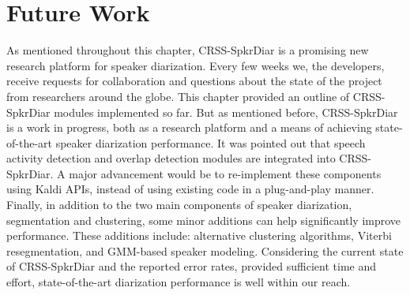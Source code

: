\section{Future Work}
\label{sec:chDiar_future}
As mentioned throughout this chapter, CRSS-SpkrDiar is a promising new research platform for speaker diarization. 
Every few weeks we, the developers, receive requests for collaboration and questions about the state of the project from researchers around the globe. 
This chapter provided an outline of CRSS-SpkrDiar modules implemented so far. 
But as mentioned before, CRSS-SpkrDiar is a work in progress, both as a research platform and a means of achieving state-of-the-art speaker diarization performance. 
It was pointed out that speech activity detection and overlap detection modules are integrated into CRSS-SpkrDiar. 
A major advancement would be to re-implement these components using Kaldi APIs, instead of using existing code in a plug-and-play manner. 
Finally, in addition to the two main components of speaker diarization, segmentation and clustering, some minor additions can help significantly improve performance. 
These additions include: alternative clustering algorithms, Viterbi resegmentation, and GMM-based speaker modeling. 
Considering the current state of CRSS-SpkrDiar and the reported error rates, provided sufficient time and effort, state-of-the-art diarization performance is well within our reach.

